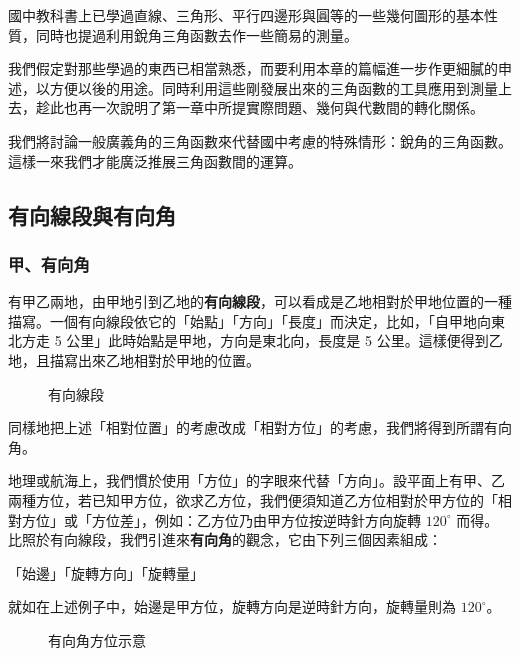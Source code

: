 國中教科書上已學過直線、三角形、平行四邊形與圓等的一些幾何圖形的基本性質，同時也提過利用銳角三角函數去作一些簡易的測量。

我們假定對那些學過的東西已相當熟悉，而要利用本章的篇幅進一步作更細膩的申述，以方便以後的用途。同時利用這些剛發展出來的三角函數的工具應用到測量上去，趁此也再一次說明了第一章中所提實際問題、幾何與代數間的轉化關係。

我們將討論一般廣義角的三角函數來代替國中考慮的特殊情形：銳角的三角函數。這樣一來我們才能廣泛推展三角函數間的運算。

\subsection{有向線段與有向角}
\label{subsec:b3s-2-1}

\subsubsection*{甲、有向角}

有甲乙兩地，由甲地引到乙地的\textbf{有向線段}，可以看成是乙地相對於甲地位置的一種描寫。一個有向線段依它的「始點」「方向」「長度」而決定，比如，「自甲地向東北方走 5 公里」此時始點是甲地，方向是東北向，長度是 5 公里。這樣便得到乙地，且描寫出來乙地相對於甲地的位置。

\begin{figure}[H]
\centering
{}
\caption{有向線段}
\label{fig:b3s-fig2-1}
\end{figure}

同樣地把上述「相對位置」的考慮改成「相對方位」的考慮，我們將得到所謂有向角。

地理或航海上，我們慣於使用「方位」的字眼來代替「方向」。設平面上有甲、乙兩種方位，若已知甲方位，欲求乙方位，我們便須知道乙方位相對於甲方位的「相對方位」或「方位差」，例如：乙方位乃由甲方位按逆時針方向旋轉 $120^\circ$ 而得。比照於有向線段，我們引進來\textbf{有向角}的觀念，它由下列三個因素組成：

「始邊」「旋轉方向」「旋轉量」

就如在上述例子中，始邊是甲方位，旋轉方向是逆時針方向，旋轉量則為 $120^\circ$。

\begin{figure}[H]
\centering
{}
\caption{有向角方位示意}
\label{fig:b3s-fig2-2}
\end{figure}

